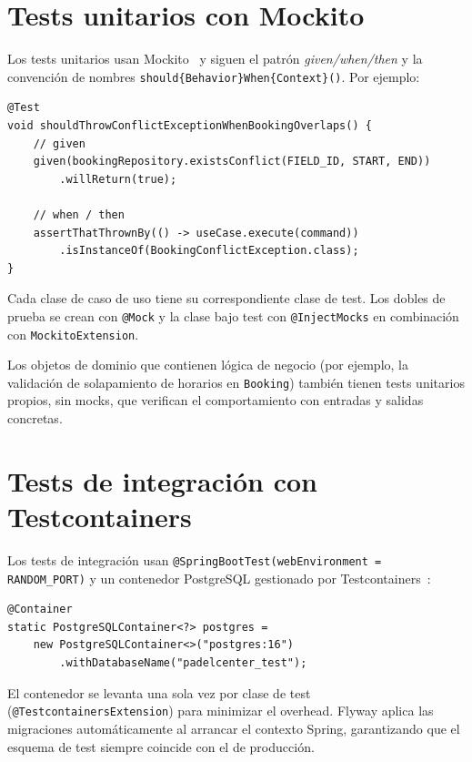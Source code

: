 \section{Tests unitarios con Mockito}
\label{sec:tests_unitarios}

Los tests unitarios usan Mockito~\cite{mockito} y siguen el patrón \textit{given/when/then} y la convención
de nombres \texttt{should\{Behavior\}When\{Context\}()}. Por ejemplo:

\begin{verbatim}
@Test
void shouldThrowConflictExceptionWhenBookingOverlaps() {
    // given
    given(bookingRepository.existsConflict(FIELD_ID, START, END))
        .willReturn(true);

    // when / then
    assertThatThrownBy(() -> useCase.execute(command))
        .isInstanceOf(BookingConflictException.class);
}
\end{verbatim}

Cada clase de caso de uso tiene su correspondiente clase de test. Los dobles
de prueba se crean con \texttt{@Mock} y la clase bajo test con \texttt{@InjectMocks}
en combinación con \texttt{MockitoExtension}.

Los objetos de dominio que contienen lógica de negocio (por ejemplo, la
validación de solapamiento de horarios en \texttt{Booking}) también tienen tests
unitarios propios, sin mocks, que verifican el comportamiento con entradas y
salidas concretas.

\section{Tests de integración con Testcontainers}
\label{sec:tests_integracion}

Los tests de integración usan \texttt{@SpringBootTest(webEnvironment = RANDOM\_PORT)}
y un contenedor PostgreSQL gestionado por Testcontainers~\cite{testcontainers}:

\begin{verbatim}
@Container
static PostgreSQLContainer<?> postgres =
    new PostgreSQLContainer<>("postgres:16")
        .withDatabaseName("padelcenter_test");
\end{verbatim}

El contenedor se levanta una sola vez por clase de test
(\texttt{@TestcontainersExtension}) para minimizar el overhead. Flyway aplica
las migraciones automáticamente al arrancar el contexto Spring, garantizando que
el esquema de test siempre coincide con el de producción.

